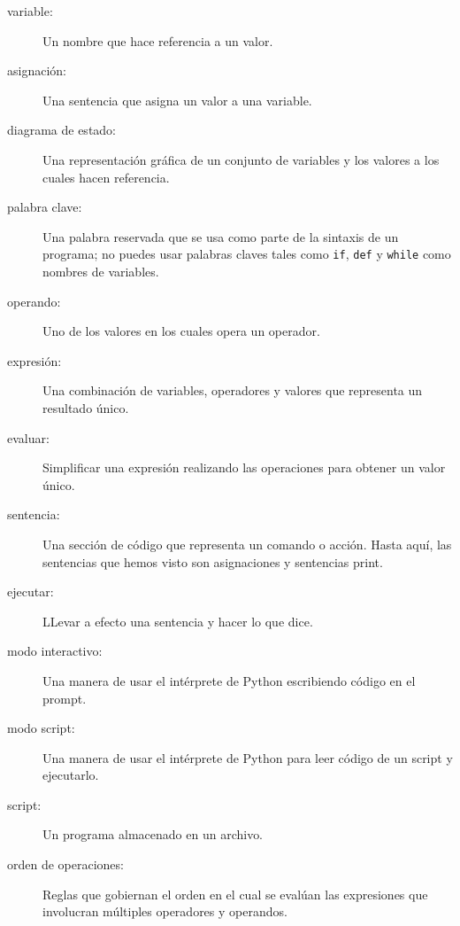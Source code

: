 \documentclass[10pt]{book}
\begin{document}
\begin{description}

\item[variable:]  Un nombre que hace referencia a un valor.

\item[asignación:]  Una sentencia que asigna un valor a una variable.

\item[diagrama de estado:]  Una representación gráfica de un conjunto de variables y los
valores a los cuales hacen referencia.

\item[palabra clave:]  Una palabra reservada que se usa como parte de la sintaxis
de un programa; no puedes usar palabras claves tales como {\tt if}, {\tt  def} y {\tt while} como
nombres de variables.

\item[operando:]  Uno de los valores en los cuales opera un operador.

\item[expresión:]  Una combinación de variables, operadores y valores que
representa un resultado único.

\item[evaluar:]  Simplificar una expresión realizando las operaciones
para obtener un valor único.

\item[sentencia:]  Una sección de código que representa un comando o acción.  Hasta
aquí, las sentencias que hemos visto son asignaciones y sentencias print.

\item[ejecutar:]  LLevar a efecto una sentencia y hacer lo que dice.

\item[modo interactivo:] Una manera de usar el intérprete de Python
escribiendo código en el prompt.

\item[modo script:] Una manera de usar el intérprete de Python para leer
código de un script y ejecutarlo.

\item[script:] Un programa almacenado en un archivo.

\item[orden de operaciones:]  Reglas que gobiernan el orden en el cual
se evalúan las expresiones que involucran múltiples operadores y operandos.


\end{description}
\end{document}
